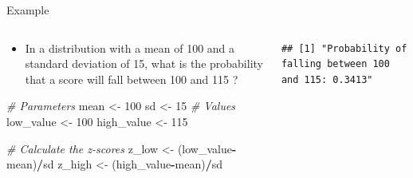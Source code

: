 \documentclass[
  ignorenonframetext,
]{beamer}
\newenvironment{Shaded}{\begin{snugshade}}{\end{snugshade}}
\newcommand{\CommentTok}[1]{\textcolor[rgb]{0.56,0.35,0.01}{\textit{#1}}}
\newcommand{\DecValTok}[1]{\textcolor[rgb]{0.00,0.00,0.81}{#1}}
\newcommand{\NormalTok}[1]{#1}
\newcommand{\OtherTok}[1]{\textcolor[rgb]{0.56,0.35,0.01}{#1}}
\newcommand{\SpecialCharTok}[1]{\textcolor[rgb]{0.81,0.36,0.00}{\textbf{#1}}}
\providecommand{\tightlist}{%
  \setlength{\itemsep}{0pt}\setlength{\parskip}{0pt}}
\begin{document}
\begin{frame}[fragile]{Example}
\label{example-6}
\begin{columns}[T]
\begin{column}{0.5\textwidth}
\begin{itemize}
\tightlist
\item
  In a distribution with a mean of 100 and a standard deviation of 15,
  what is the probability that a score will fall between 100 and 115 ?
\end{itemize}

\begin{Shaded}
\begin{Highlighting}[]
\CommentTok{\# Parameters}
\NormalTok{mean }\OtherTok{\textless{}{-}} \DecValTok{100}
\NormalTok{sd }\OtherTok{\textless{}{-}} \DecValTok{15}
\CommentTok{\# Values}
\NormalTok{low\_value }\OtherTok{\textless{}{-}} \DecValTok{100}
\NormalTok{high\_value }\OtherTok{\textless{}{-}} \DecValTok{115}

\CommentTok{\# Calculate the z{-}scores}
\NormalTok{z\_low }\OtherTok{\textless{}{-}}\NormalTok{ (low\_value}\SpecialCharTok{{-}}\NormalTok{mean)}\SpecialCharTok{/}\NormalTok{sd}
\NormalTok{z\_high }\OtherTok{\textless{}{-}}\NormalTok{ (high\_value}\SpecialCharTok{{-}}\NormalTok{mean)}\SpecialCharTok{/}\NormalTok{sd}
\end{Highlighting}
\end{Shaded}
\end{column}

\begin{column}{0.5\textwidth}
\begin{verbatim}
## [1] "Probability of falling between 100 and 115: 0.3413"
\end{verbatim}


\end{column}
\end{columns}
\end{frame}
\end{document}
